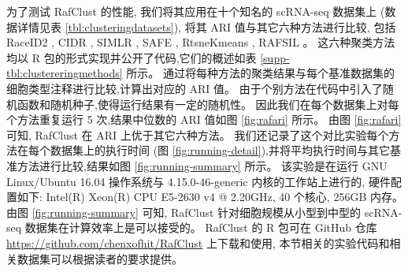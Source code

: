
为了测试 RafClust 的性能,
我们将其应用在十个知名的 scRNA-seq 数据集上 (数据详情见表 \ref{tbl:clusteringdatasets}),
将其 ARI 值与其它六种方法进行比较,
包括 RaceID2 , CIDR , SIMLR , SAFE , RtsneKmeans , RAFSIL 。
这六种聚类方法均以 R 包的形式实现并公开了代码,它们的概述如表 \ref{supp-tbl:clustereringmethods} 所示。
通过将每种方法的聚类结果与每个基准数据集的细胞类型注释进行比较,计算出对应的 ARI 值。 
由于个别方法在代码中引入了随机函数和随机种子,使得运行结果有一定的随机性。
因此我们在每个数据集上对每个方法重复运行 5 次,结果中位数的 ARI 值如图 \ref{fig:rafari} 所示。
由图 \ref{fig:rafari} 可知, RafClust 在 ARI 上优于其它六种方法。
我们还记录了这个对比实验每个方法在每个数据集上的执行时间 (图 \ref{fig:running-detail}),并将平均执行时间与其它基准方法进行比较,结果如图 \ref{fig:running-summary} 所示。
该实验是在运行 GNU Linux/Ubuntu 16.04 操作系统与 4.15.0-46-generic 内核的工作站上进行的,
硬件配置如下: Intel(R) Xeon(R) CPU E5-2630 v4 @ 2.20GHz, 40 个核心, 256GB 内存。
由图 \ref{fig:running-summary} 可知, RafClust 针对细胞规模从小型到中型的 scRNA-seq 数据集在计算效率上是可以接受的。
RafClust 的 R 包可在 GitHub 仓库 \url{https://github.com/chenxofhit/RafClust} 上下载和使用,
本节相关的实验代码和相关数据集可以根据读者的要求提供。


